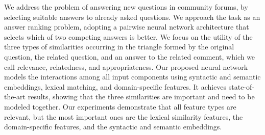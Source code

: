 We address the problem of answering new questions in community forums, by selecting suitable answers to already asked questions. We approach the task as an answer ranking problem, adopting a pairwise neural network architecture that selects which of two competing answers is better. We focus on the utility of the three types of similarities occurring in the triangle formed by the original question, the related question, and an answer to the related comment, which we call relevance, relatedness, and appropriateness. Our proposed neural network models the interactions among all input components using syntactic and semantic embeddings, lexical matching, and domain-specific features. It achieves state-of-the-art results, showing that the three similarities are important and need to be modeled together. Our experiments demonstrate that all feature types are relevant, but the most important ones are the lexical similarity features, the domain-specific features, and the syntactic and semantic embeddings.
